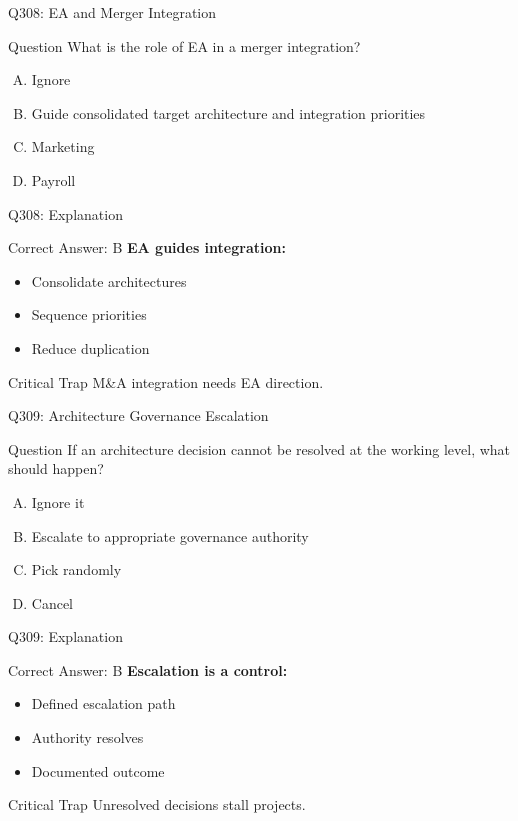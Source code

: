 \documentclass{beamer}
\begin{document}
	\begin{frame}{Q308: EA and Merger Integration}
		\begin{block}{Question}
			What is the role of EA in a merger integration?
		\end{block}
		\begin{enumerate}[(A)]
			\item Ignore
			\item Guide consolidated target architecture and integration priorities
			\item Marketing
			\item Payroll
		\end{enumerate}
	\end{frame}
	
	\begin{frame}{Q308: Explanation}
		\begin{block}{Correct Answer: B}
			\textbf{EA guides integration:}
			\begin{itemize}
				\item Consolidate architectures
				\item Sequence priorities
				\item Reduce duplication
			\end{itemize}
		\end{block}
		\begin{alertblock}{Critical Trap}
			M&A integration needs EA direction.
		\end{alertblock}
	\end{frame}
	
	\begin{frame}{Q309: Architecture Governance Escalation}
		\begin{block}{Question}
			If an architecture decision cannot be resolved at the working level, what should happen?
		\end{block}
		\begin{enumerate}[(A)]
			\item Ignore it
			\item Escalate to appropriate governance authority
			\item Pick randomly
			\item Cancel
		\end{enumerate}
	\end{frame}
	
	\begin{frame}{Q309: Explanation}
		\begin{block}{Correct Answer: B}
			\textbf{Escalation is a control:}
			\begin{itemize}
				\item Defined escalation path
				\item Authority resolves
				\item Documented outcome
			\end{itemize}
		\end{block}
		\begin{alertblock}{Critical Trap}
			Unresolved decisions stall projects.
		\end{alertblock}
	\end{frame}
	
\end{document}
